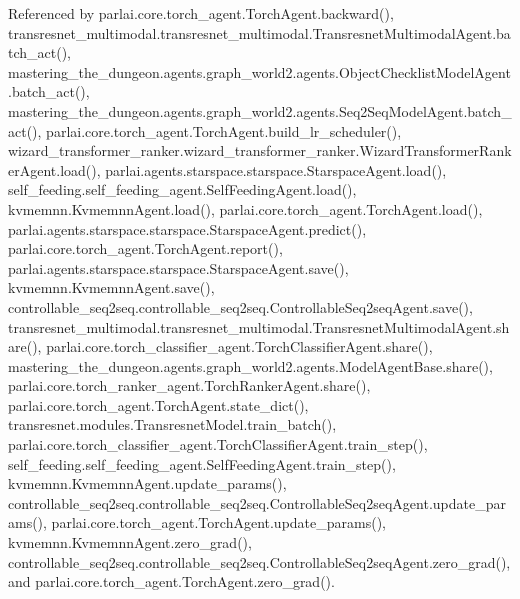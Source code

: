 Referenced by parlai.\+core.\+torch\+\_\+agent.\+Torch\+Agent.\+backward(), transresnet\+\_\+multimodal.\+transresnet\+\_\+multimodal.\+Transresnet\+Multimodal\+Agent.\+batch\+\_\+act(), mastering\+\_\+the\+\_\+dungeon.\+agents.\+graph\+\_\+world2.\+agents.\+Object\+Checklist\+Model\+Agent.\+batch\+\_\+act(), mastering\+\_\+the\+\_\+dungeon.\+agents.\+graph\+\_\+world2.\+agents.\+Seq2\+Seq\+Model\+Agent.\+batch\+\_\+act(), parlai.\+core.\+torch\+\_\+agent.\+Torch\+Agent.\+build\+\_\+lr\+\_\+scheduler(), wizard\+\_\+transformer\+\_\+ranker.\+wizard\+\_\+transformer\+\_\+ranker.\+Wizard\+Transformer\+Ranker\+Agent.\+load(), parlai.\+agents.\+starspace.\+starspace.\+Starspace\+Agent.\+load(), self\+\_\+feeding.\+self\+\_\+feeding\+\_\+agent.\+Self\+Feeding\+Agent.\+load(), kvmemnn.\+Kvmemnn\+Agent.\+load(), parlai.\+core.\+torch\+\_\+agent.\+Torch\+Agent.\+load(), parlai.\+agents.\+starspace.\+starspace.\+Starspace\+Agent.\+predict(), parlai.\+core.\+torch\+\_\+agent.\+Torch\+Agent.\+report(), parlai.\+agents.\+starspace.\+starspace.\+Starspace\+Agent.\+save(), kvmemnn.\+Kvmemnn\+Agent.\+save(), controllable\+\_\+seq2seq.\+controllable\+\_\+seq2seq.\+Controllable\+Seq2seq\+Agent.\+save(), transresnet\+\_\+multimodal.\+transresnet\+\_\+multimodal.\+Transresnet\+Multimodal\+Agent.\+share(), parlai.\+core.\+torch\+\_\+classifier\+\_\+agent.\+Torch\+Classifier\+Agent.\+share(), mastering\+\_\+the\+\_\+dungeon.\+agents.\+graph\+\_\+world2.\+agents.\+Model\+Agent\+Base.\+share(), parlai.\+core.\+torch\+\_\+ranker\+\_\+agent.\+Torch\+Ranker\+Agent.\+share(), parlai.\+core.\+torch\+\_\+agent.\+Torch\+Agent.\+state\+\_\+dict(), transresnet.\+modules.\+Transresnet\+Model.\+train\+\_\+batch(), parlai.\+core.\+torch\+\_\+classifier\+\_\+agent.\+Torch\+Classifier\+Agent.\+train\+\_\+step(), self\+\_\+feeding.\+self\+\_\+feeding\+\_\+agent.\+Self\+Feeding\+Agent.\+train\+\_\+step(), kvmemnn.\+Kvmemnn\+Agent.\+update\+\_\+params(), controllable\+\_\+seq2seq.\+controllable\+\_\+seq2seq.\+Controllable\+Seq2seq\+Agent.\+update\+\_\+params(), parlai.\+core.\+torch\+\_\+agent.\+Torch\+Agent.\+update\+\_\+params(), kvmemnn.\+Kvmemnn\+Agent.\+zero\+\_\+grad(), controllable\+\_\+seq2seq.\+controllable\+\_\+seq2seq.\+Controllable\+Seq2seq\+Agent.\+zero\+\_\+grad(), and parlai.\+core.\+torch\+\_\+agent.\+Torch\+Agent.\+zero\+\_\+grad().

\mbox{\label{classparlai_1_1agents_1_1starspace_1_1starspace_1_1StarspaceAgent_a9c521ca705e241271b6bb34bd5b22bea}} 
